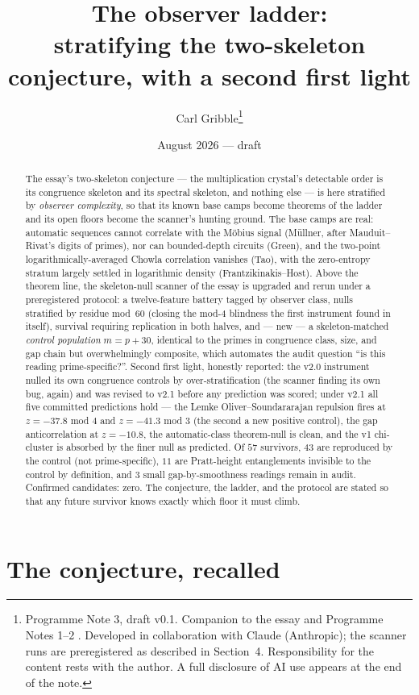 \documentclass[11pt]{article}
\title{The observer ladder:\\ stratifying the two-skeleton conjecture, with a second first light}
\author{Carl Gribble\thanks{Programme Note 3, draft v0.1. Companion to the essay \cite{Essay} and
Programme Notes 1--2 \cite{Defs, Engine}. Developed in collaboration with Claude (Anthropic); the
scanner runs are preregistered as described in Section~4. Responsibility for the content rests with
the author. A full disclosure of AI use appears at the end of the note.}}
\date{August 2026 --- draft}
\theoremstyle{remark}
\begin{document}
\maketitle

\begin{abstract}
The essay's two-skeleton conjecture --- the multiplication crystal's detectable order is its
congruence skeleton and its spectral skeleton, and nothing else --- is here stratified by
\emph{observer complexity}, so that its known base camps become theorems of the ladder and its
open floors become the scanner's hunting ground. The base camps are real: automatic sequences
cannot correlate with the M\"obius signal (M\"ullner, after Mauduit--Rivat's digits of primes),
nor can bounded-depth circuits (Green), and the two-point logarithmically-averaged Chowla
correlation vanishes (Tao), with the zero-entropy stratum largely settled in logarithmic density
(Frantzikinakis--Host). Above the theorem line, the skeleton-null scanner of the essay is upgraded
and rerun under a preregistered protocol: a twelve-feature battery tagged by observer class,
nulls stratified by residue mod~$60$ (closing the mod-$4$ blindness the first instrument found in
itself), survival requiring replication in both halves, and --- new --- a skeleton-matched
\emph{control population} $m = p + 30$, identical to the primes in congruence class, size, and gap
chain but overwhelmingly composite, which automates the audit question ``is this reading
prime-specific?''. Second first light, honestly reported: the v2.0 instrument nulled its own
congruence controls by over-stratification (the scanner finding its own bug, again) and was
revised to v2.1 before any prediction was scored; under v2.1 all five committed predictions hold
--- the Lemke Oliver--Soundararajan repulsion fires at $z = -37.8$ mod $4$ and $z = -41.3$ mod $3$
(the second a new positive control), the gap anticorrelation at $z = -10.8$, the automatic-class
theorem-null is clean, and the v1 chi-cluster is absorbed by the finer null as predicted. Of $57$
survivors, $43$ are reproduced by the control (not prime-specific), $11$ are Pratt-height
entanglements invisible to the control by definition, and $3$ small gap-by-smoothness readings
remain in audit. Confirmed candidates: zero. The conjecture, the ladder, and the protocol are
stated so that any future survivor knows exactly which floor it must climb.
\end{abstract}

\section{The conjecture, recalled}
\end{document}
